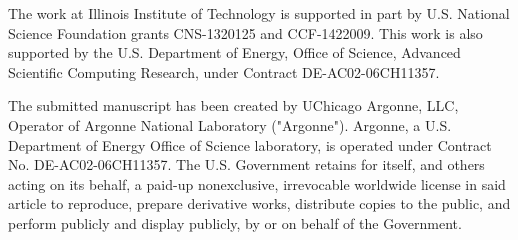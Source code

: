 \documentclass[conference,compsoc]{IEEEtran}
\begin{document}
The work at Illinois Institute of Technology is supported in part by U.S. National Science Foundation grants CNS-1320125 and CCF-1422009. This work is also supported by the U.S. Department of Energy, Office of Science, Advanced Scientific Computing Research, under Contract DE-AC02-06CH11357.





  


 \vspace{5\baselineskip}
 
 \begin{framed}
 The submitted manuscript has been created by UChicago Argonne, LLC, Operator of Argonne National Laboratory ("Argonne").  Argonne, a U.S. Department of Energy Office of Science laboratory, is operated under Contract No. DE-AC02-06CH11357.  The U.S. Government retains for itself, and others acting on its behalf, a paid-up nonexclusive, irrevocable worldwide license in said article to reproduce, prepare derivative works, distribute copies to the public, and perform publicly and display publicly, by or on behalf of the Government.
 \end{framed}




\end{document}
